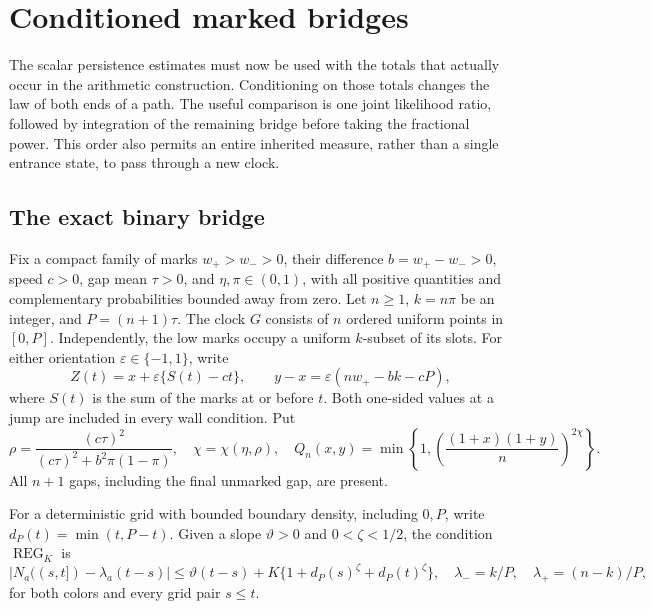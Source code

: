 \section{Conditioned marked bridges}\label{sec:bridges}

The scalar persistence estimates must now be used with the totals that
actually occur in the arithmetic construction. Conditioning on those
totals changes the law of both ends of a path. The useful comparison is
one joint likelihood ratio, followed by integration of the remaining
bridge before taking the fractional power. This order also permits an
entire inherited measure, rather than a single entrance state, to pass
through a new clock.

\subsection{The exact binary bridge}

Fix a compact family of marks $w_+>w_->0$, their difference
$b=w_+-w_->0$, speed $c>0$, gap mean $\tau>0$, and
$\eta,\pi\in(0,1)$, with all positive quantities and complementary
probabilities bounded away from zero. Let $n\ge1$, $k=n\pi$ be an
integer, and $P=(n+1)\tau$. The clock $G$ consists of $n$ ordered
uniform points in $[0,P]$. Independently, the low marks occupy a
uniform $k$-subset of its slots. For either orientation
$\varepsilon\in\{-1,1\}$, write
\begin{equation}
 Z(t)=x+\varepsilon\{S(t)-ct\},\qquad
 y-x=\varepsilon(nw_+-bk-cP),
 \label{bridge:endpoint}
\end{equation}
where $S(t)$ is the sum of the marks at or before $t$. Both one-sided
values at a jump are included in every wall condition. Put
\begin{equation}
 \rho=\frac{(c\tau)^2}{(c\tau)^2+b^2\pi(1-\pi)},\quad
 \chi=\chi(\eta,\rho),\quad
 Q_n(x,y)=\min\left\{1,
     \left(\frac{(1+x)(1+y)}n\right)^{2\chi}\right\}.
 \label{bridge:Q}
\end{equation}
All $n+1$ gaps, including the final unmarked gap, are present.

For a deterministic grid with bounded boundary density, including
$0,P$, write $d_P(t)=\min(t,P-t)$. Given a slope $\vartheta>0$ and
$0<\zeta<1/2$, the condition $\operatorname{REG}_K$ is
\begin{equation}
 |N_a((s,t])-\lambda_a(t-s)|
 \le\vartheta(t-s)+K\{1+d_P(s)^\zeta+d_P(t)^\zeta\},
 \quad \lambda_- =k/P,\quad\lambda_+=(n-k)/P,
 \label{bridge:REG}
\end{equation}
for both colors and every grid pair $s\le t$.

